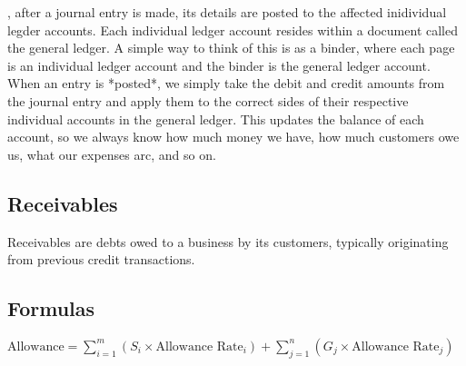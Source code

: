   , after a journal entry is made, its details are posted to the affected inidividual legder accounts. Each individual ledger account resides within a document called the general ledger. A simple way to think of this is as a binder, where each page is an individual ledger account and the binder is the general ledger account. When an entry is *posted*, we simply take the debit and credit amounts from the journal entry and apply them to the correct sides of their respective individual accounts in the general ledger. This updates the balance of each account, so we always know how much money we have, how much customers owe us, what our expenses arc, and so on.

  



\newpage
\subsection{Receivables}

Receivables are debts owed to a business by its customers, typically originating from previous credit transactions. 


\subsection{Formulas}

$\text{Allowance} = \sum_{i=1}^{m} (S_i \times \text{Allowance Rate}_i) + \sum_{j=1}^{n} (G_j \times \text{Allowance Rate}_j)$
